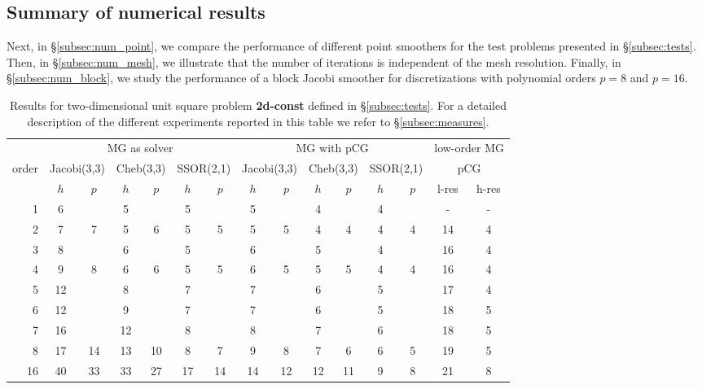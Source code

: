 \documentclass[smallcondensed,final]{svjour3}     %
\newcommand{\gsnote}[1]{\textcolor{blue}{GS: #1}}
\begin{document}
\subsection{Summary of numerical results}\label{subsec:results}
Next, in \S\ref{subsec:num_point}, we compare the performance of
different point smoothers for the test problems presented in
\S\ref{subsec:tests}. Then, in \S\ref{subsec:num_mesh}, we
illustrate that the number of iterations is independent of the mesh
resolution. Finally, in \S\ref{subsec:num_block}, we study the
performance of a block Jacobi smoother for discretizations with
polynomial orders $p=8$ and $p=16$.


\begin{table}
  \caption{\label{tab:box} Results for two-dimensional unit square
    problem {\bf 2d-const} defined in \S\ref{subsec:tests}.
    For a detailed description of the
    different experiments reported in this table we refer to
    \S\ref{subsec:measures}.}  \centering
  \begin{tabular}{|r|c c|c c|c c||c c|c c|c c||c c|} 
    \hline
    & \multicolumn{6}{c||}{MG as solver} & \multicolumn{6}{c||}{MG
      with pCG} & \multicolumn{2}{r|}{\!\!low-order MG\!\!} \\
    \cline{2-13}
    \!\!\! order \!\!\!\! &  \multicolumn{2}{c|}{\!\!\scriptsize  Jacobi(3,3)\!\!} &  \multicolumn{2}{c|}{\!\!\scriptsize Cheb(3,3)\!\!} & \multicolumn{2}{c||}{\!\!\scriptsize  SSOR(2,1)\!\!} & \multicolumn{2}{c|}{\!\!\scriptsize Jacobi(3,3)\!\!} &  \multicolumn{2}{c|}{\!\!\scriptsize Cheb(3,3)\!\!} & \multicolumn{2}{c||}{\!\!\scriptsize SSOR(2,1)\!\!} & \multicolumn{2}{c|}{pCG}\\
\hline
 & $h$ & $p$ & $h$ & $p$& $h$ & $p$& $h$ & $p$& $h$ & $p$& $h$ & $p$&
l-res & h-res\\
 \cline{2-15}
1 & 6 & & 5 & & 5 & & 5 & & 4 & & 4 & & -  & - \\
2 & 7 & 7 & 5 & 6 & 5 & 5 & 5 & 5 & 4 & 4 & 4 & 4 & 14 & 4 \\
3 & 8 & & 6 & & 5 & & 6 & & 5 & & 4 & & 16  & 4 \\
4 & 9 & 8 & 6 & 6 & 5 & 5 & 6 & 5 & 5 & 5 & 4 & 4 & 16 & 4 \\
5 & 12 & & 8 & & 7 & & 7 & & 6 & & 5 & & 17 & 4 \\
6 & 12 & & 9 & & 7 & & 7 & & 6 & & 5 & & 18 & 5\\
7 & 16 & & 12 & & 8 & & 8 & & 7 & & 6 & & 18 & 5 \\
8 & 17 & 14 & 13 & 10 & 8 & 7 & 9 & 8 & 7 & 6 & 6 & 5 & 19 & 5\\
16 & 40 & 33 & 33 & 27 & 17 & 14 & 14 & 12 & 12 & 11 & 9 & 8 & 21 & 8 \\
\hline
  \end{tabular}
\end{table}
\end{document}
